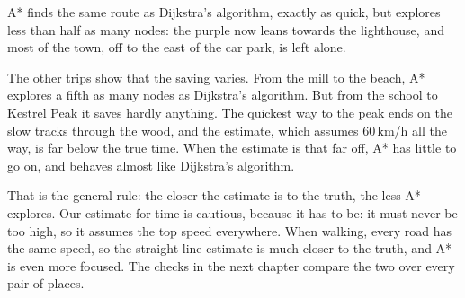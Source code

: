 A* finds the same route as Dijkstra's algorithm, exactly as quick, but
explores less than half as many nodes: the purple now leans towards the
lighthouse, and most of the town, off to the east of the car park, is
left alone.

The other trips show that the saving varies. From the mill to the beach,
A* explores a fifth as many nodes as Dijkstra's algorithm. But from the
school to Kestrel Peak it saves hardly anything. The quickest way to the
peak ends on the slow tracks through the wood, and the estimate, which
assumes 60\,km/h all the way, is far below the true time. When the
estimate is that far off, A* has little to go on, and behaves almost like
Dijkstra's algorithm.

That is the general rule: the closer the estimate is to the truth, the
less A* explores. Our estimate for time is cautious, because it has to be:
it must never be too high, so it assumes the top speed everywhere. When
walking, every road has the same speed, so the straight-line estimate is
much closer to the truth, and A* is even more focused. The checks in the next chapter compare the two over every pair of
places.

